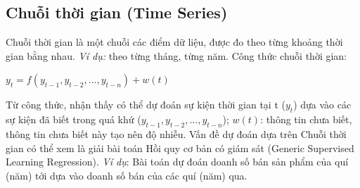 \documentclass[12pt]{extarticle}
\begin{document}
		\subsection{Chuỗi thời gian (Time Series)}
			\par Chuỗi thời gian là một chuỗi các điểm dữ liệu, được đo theo từng khoảng thời gian bằng nhau. \textit{Ví dụ:} theo từng tháng, từng năm. Công thức chuỗi thời gian:
			\begin{center}
				$y_{t}=f(y_{t-1},y_{t-2},...,y_{t-n}) + w(t)$
			\end{center}
			\par Từ công thức, nhận thấy có thể dự đoán sự kiện thời gian tại t ($y_{t}$) dựa vào các sự kiện đã biết trong quá khứ ($y_{t-1},y_{t-2},...,y_{t-n}$); $w(t)$: thông tin chưa biết, thông tin chưa biết này tạo nên độ nhiễu. Vấn đề dự đoán dựa trên Chuỗi thời gian có thể xem là giải bài toán Hồi quy cơ bản có giám sát (Generic Supervised Learning Regression). \textit{Ví dụ}: Bài toán dự đoán doanh số bán sản phẩm của quí (năm) tới dựa vào doanh số bán của các quí (năm) qua.
\end{document}

